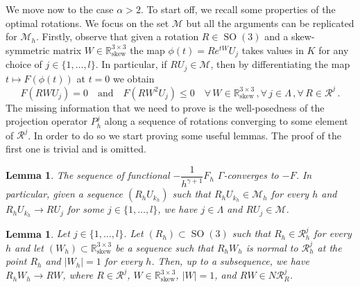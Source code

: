 \documentclass{article}
\theoremstyle{plain}
\theoremstyle{plain}
\theoremstyle{plain}
\newtheorem{lemma}[teo]{Lemma}
\theoremstyle{plain}
\theoremstyle{plain}
\theoremstyle{definition}
\theoremstyle{definition}
\renewcommand{\r}{\mathbb{R}}
\DeclareMathOperator{\SO}{SO}
\DeclareMathOperator{\skw}{skew}
\begin{document}
We move now to the case $\alpha > 2$. To start off, we recall some properties of the optimal rotations. We focus on the set $\mathcal{M}$ but all the arguments can be replicated for $\mathcal{M}_h$. Firstly, observe that given a rotation $R \in \SO(3)$ and a skew-symmetric matrix $W \in \r^{3 \times 3}_{\skw}$ the map $\phi(t) = Re^{tW}U_j$ takes values in $K$ for any choice of $j \in \{1, \dots, l\}$. In particular, if $RU_j \in \mathcal{M}$, then by differentiating the map $t \mapsto F(\phi(t))$ at $t = 0$ we obtain
\[
	F(RWU_j) = 0 \quad \text{and} \quad F(RW^2U_j) \leq 0 \quad \forall \, W \in \r^{3 \times 3}_{\skw}\,, \forall \, j \in \Lambda \,, \forall \, R \in \mathcal{R}^j \,.
\]
The missing information that we need to prove  is the well-posedness of the projection operator $P_h^j$ along a sequence of rotations converging to some element of $\mathcal{R}^j$. In order to do so we start proving some useful lemmas. The proof of the first one is trivial and is omitted.
\begin{lemma}\label{lemma:gamma_convergence_F}
	The sequence of functional $-\dfrac{1}{h^{\gamma+1}} F_h$ $\Gamma$-converges to $-F$. In particular, given a sequence $(R_h U_{k_h})$ such that $R_h U_{k_h} \in \mathcal{M}_h$ for every $h$ and $R_h U_{k_h} \to RU_j$ for some $j \in \{1, \dots, l\}$, we have $j \in \Lambda$ and $RU_j \in \mathcal{M}$.
\end{lemma}

\begin{lemma}\label{lemma:convergence_normals_R_h}
	Let $j \in \{1, \dots, l\}$. Let $(R_h) \subset \SO(3)$ such that $R_h \in \mathcal{R}^j_h$ for every $h$ and let $(W_h) \subset \r^{3 \times 3}_{\skw}$ be a sequence such that $R_hW_h$ is normal to $\mathcal{R}_h^j$ at the point $R_h$ and $|W_h| = 1$ for every $h$. Then, up to a subsequence, we have $R_h W_h \to RW$, where $R \in \mathcal{R}^j$, $W \in \r^{3 \times 3}_{\skw}$, $|W| = 1$, and $RW \in N \mathcal{R}^j_R$.
\end{lemma}
\end{document}
